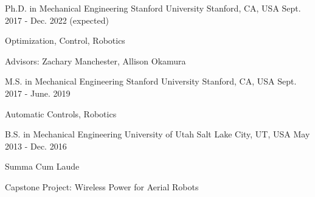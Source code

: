 

\begin{cventries}

  \cventry
    {Ph.D. in Mechanical Engineering} %
    {Stanford University} %
    {Stanford, CA, USA} %
    {Sept. 2017 - Dec. 2022 (expected)} %
    {
      \begin{cvitems} %
        \item {Optimization, Control, Robotics}
        \item {Advisors: Zachary Manchester, Allison Okamura}
      \end{cvitems}
    }
    
  \cventry
    {M.S. in Mechanical Engineering} %
    {Stanford University} %
    {Stanford, CA, USA} %
    {Sept. 2017 - June. 2019} %
    {
      \begin{cvitems} %
        \item {Automatic Controls, Robotics}
      \end{cvitems}
    }
    
  \cventry
    {B.S. in Mechanical Engineering} %
    {University of Utah} %
    {Salt Lake City, UT, USA} %
    {May 2013 - Dec. 2016} %
    {
      \begin{cvitems} %
        \item {Summa Cum Laude}
        \item {Capstone Project: Wireless Power for Aerial Robots}
      \end{cvitems}
    }

\end{cventries}
